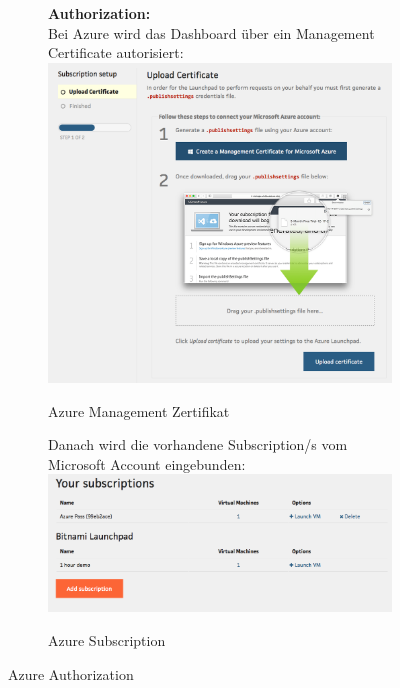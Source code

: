 \begin{figure}[!htbp]
 \begin{subfigure}[b]{.49\textwidth}
\textbf{Authorization:}\\
Bei Azure wird das Dashboard über ein Management Certificate autorisiert:
\includegraphics[width=\textwidth]{./03_Analyse/03_Bitnami/images/azure_authorize}
\caption{Azure Management Zertifikat}
\end{subfigure}
\hfill
 \begin{subfigure}[b]{.49\textwidth}
Danach wird die vorhandene Subscription/s vom Microsoft Account eingebunden:
\includegraphics[width=\textwidth]{./03_Analyse/03_Bitnami/images/azure_subscriptions}
\caption{Azure Subscription}
\end{subfigure}
\caption{Azure Authorization}
\end{figure}


